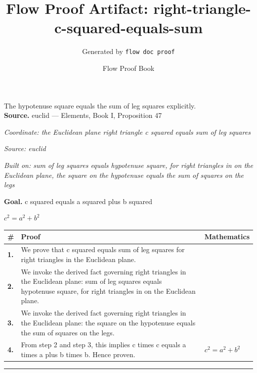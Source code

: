 \documentclass[11pt]{article}
\title{Flow Proof Artifact: right-triangle-c-squared-equals-sum}
\author{Generated by \texttt{flow doc proof}}
\date{Flow Proof Book}
\theoremstyle{definition}
\begin{document}
\maketitle
The hypotenuse square equals the sum of leg squares explicitly.\\[0.5em]
\textbf{Source.} euclid — Elements, Book I, Proposition 47\\[0.5em]
\bigskip
{}\par
\smallskip\noindent\textit{Coordinate: the Euclidean plane \cdot right triangle \cdot c squared equals sum of leg squares}\par
\smallskip\noindent\textit{Source: euclid}\par
\smallskip\noindent\textit{Built on: sum of leg squares equals hypotenuse square, for right triangles in on the Euclidean plane, the square on the hypotenuse equals the sum of squares on the legs}\par
\medskip
\noindent\textbf{Goal.} c squared equals a squared plus b squared\par
\noindent$\displaystyle c^{2} = a^{2} + b^{2}$\par
\medskip
\noindent
\begin{tabular}{@{} >{\raggedright\arraybackslash}p{} >{\raggedright\arraybackslash}p{} >{\raggedleft\arraybackslash}p{} @{}}
\textbf{\#} & \textbf{Proof} & \textbf{Mathematics} \\
\midrule
\textbf{1.} & We prove that c squared equals sum of leg squares for right triangles in the Euclidean plane. & \\[0.45em]
\textbf{2.} & We invoke the derived fact governing right triangles in the Euclidean plane: sum of leg squares equals hypotenuse square, for right triangles in on the Euclidean plane. & \\[0.45em]
\textbf{3.} & We invoke the derived fact governing right triangles in the Euclidean plane: the square on the hypotenuse equals the sum of squares on the legs. & \\[0.45em]
\textbf{4.} & From step 2 and step 3, this implies c times c equals a times a plus b times b. Hence proven. & $\displaystyle c^{2} = a^{2} + b^{2}$ \\[0.45em]
\bottomrule
\end{tabular}
\label{thm:Geometry-right triangle-c_squared_equals_sum_of_leg_squares}
\par\medskip\hrule
\end{document}
